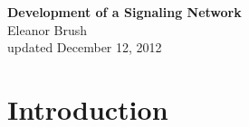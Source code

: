 \documentclass{article}
\begin{document}
\begin{center}
\Large

\end{center}


\vspace{0pt}

\begin{center}
{\bf \LARGE{Development of a Signaling Network}}
\vspace{10pt}
\\ Eleanor Brush 
\\ updated December 12, 2012
\end{center}

\tableofcontents

\vspace{0pt}
\normalsize

\section{Introduction}
\end{document}
